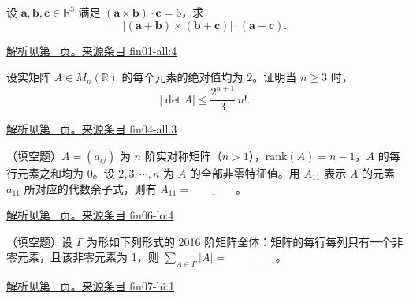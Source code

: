 \documentclass[UTF8,12pt,a4paper,fontset=fandol]{ctexart}
\begin{document}
\begin{example}\label{ex:fin01-all:4}

设 $\boldsymbol a,\boldsymbol b,\boldsymbol c\in\mathbb R^3$ 满足
$(\boldsymbol a\times\boldsymbol b)\cdot\boldsymbol c=6$，求
\[
\bigl[(\boldsymbol a+\boldsymbol b)\times(\boldsymbol b+\boldsymbol c)\bigr]
\cdot(\boldsymbol a+\boldsymbol c).
\]

\par\hyperref[ans:fin01-all:4]{解析见第~\pageref{ans:fin01-all:4} 页。}\quad\href{https://github.com/lzxcr/cmc-mathematics/blob/64916fa1fdbc3e444a652eca204d5669058ee321/src/problems/finals/01/04.md}{来源条目 fin01-all:4}

\end{example}

\begin{example}\label{ex:fin04-all:3}

设实矩阵 $A\in M_n(\mathbb R)$ 的每个元素的绝对值均为 $2$。证明当 $n\ge3$ 时，
\[
|\det A|\le\frac{2^{n+1}}3\,n!.
\]

\par\hyperref[ans:fin04-all:3]{解析见第~\pageref{ans:fin04-all:3} 页。}\quad\href{https://github.com/lzxcr/cmc-mathematics/blob/64916fa1fdbc3e444a652eca204d5669058ee321/src/problems/finals/04/03.md}{来源条目 fin04-all:3}

\end{example}

\begin{example}\label{ex:fin06-lo:4}

（填空题）$A=(a_{ij})$ 为 $n$ 阶实对称矩阵（$n>1$），$\mathrm{rank}(A)=n-1$，$A$ 的每行元素之和均为 $0$。设 $2,3,\cdots,n$ 为 $A$ 的全部非零特征值。用 $A_{11}$ 表示 $A$ 的元素 $a_{11}$ 所对应的代数余子式，则有 $A_{11}=\underline{\qquad\qquad}$。

\par\hyperref[ans:fin06-lo:4]{解析见第~\pageref{ans:fin06-lo:4} 页。}\quad\href{https://github.com/lzxcr/cmc-mathematics/blob/64916fa1fdbc3e444a652eca204d5669058ee321/src/problems/finals/06/04.md}{来源条目 fin06-lo:4}

\end{example}

\begin{example}\label{ex:fin07-hi:1}

（填空题）设 $\Gamma$ 为形如下列形式的 2016 阶矩阵全体：矩阵的每行每列只有一个非零元素，且该非零元素为 1，则 $\sum_{A\in\Gamma}\left|A\right|=$ $\underline{\qquad\qquad}$。

\par\hyperref[ans:fin07-hi:1]{解析见第~\pageref{ans:fin07-hi:1} 页。}\quad\href{https://github.com/lzxcr/cmc-mathematics/blob/64916fa1fdbc3e444a652eca204d5669058ee321/src/problems/finals/07/01.md}{来源条目 fin07-hi:1}

\end{example}
\end{document}
